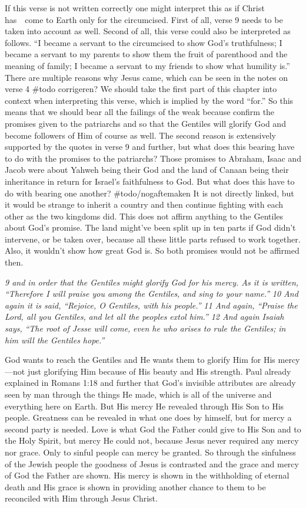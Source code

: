 If this verse is not written correctly one might interpret this as if
Christ has~~come to Earth only for the circumcised. First of all, verse
9 needs to be taken into account as well. Second of all, this verse
could also be interpreted as follows. ``I became a servant to the
circumcised to show God's truthfulness; I became a servant to my parents
to show them the fruit of parenthood and the meaning of family; I became
a servant to my friends to show what humility is.'' There are multiple
reasons why Jesus came, which can be seen in the notes on verse 4 \#todo
corrigeren? We should take the first part of this chapter into context
when interpreting this verse, which is implied by the word ``for.'' So
this means that we should bear all the failings of the weak because
confirm the promises given to the patriarchs and so that the Gentiles
will glorify God and become followers of Him of course as well. The
second reason is extensively supported by the quotes in verse 9 and
further, but what does this bearing have to do with the promises to the
patriarchs? Those promises to Abraham, Isaac and Jacob were about Yahweh
being their God and the land of Canaan being their inheritance in return
for Israel's faithfulness to God. But what does this have to do with
bearing one another? \#todo/nogaftemaken It is not directly linked, but
it would be strange to inherit a country and then continue fighting with
each other as the two kingdoms did. This does not affirm anything to the
Gentiles about God's promise. The land might've been split up in ten
parts if God didn't intervene, or be taken over, because all these
little parts refused to work together. Also, it wouldn't show how great
God is. So both promises would not be affirmed then.

\emph{9 and in order that the Gentiles might glorify God for his mercy.
As it is written,} \emph{``Therefore I will praise you among the
Gentiles,} \emph{and sing to your name.''} \emph{10 And again it is
said,} \emph{``Rejoice, O Gentiles, with his people.''} \emph{11 And
again,} \emph{``Praise the Lord, all you Gentiles,} \emph{and let all
the peoples extol him.''} \emph{12 And again Isaiah says,} \emph{``The
root of Jesse will come,} \emph{even he who arises to rule the
Gentiles;} \emph{in him will the Gentiles hope.''}

God wants to reach the Gentiles and He wants them to glorify Him for His
mercy---not just glorifying Him because of His beauty and His strength.
Paul already explained in Romans 1:18 and further that God's invisible
attributes are already seen by man through the things He made, which is
all of the universe and everything here on Earth. But His mercy He
revealed through His Son to His people. Greatness can be revealed in
what one does by himself, but for mercy a second party is needed. Love
is what God the Father could give to His Son and to the Holy Spirit, but
mercy He could not, because Jesus never required any mercy nor grace.
Only to sinful people can mercy be granted. So through the sinfulness of
the Jewish people the goodness of Jesus is contrasted and the grace and
mercy of God the Father are shown. His mercy is shown in the withholding
of eternal death and His grace is shown in providing another chance to
them to be reconciled with Him through Jesus Christ.

